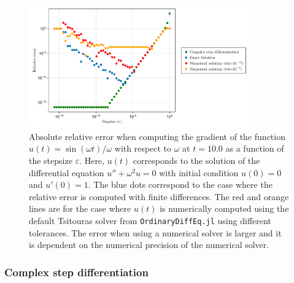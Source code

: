 \begin{figure}[tbh]
    \centering
    \includegraphics[width=0.85\textwidth]{../code/finite_differences/finite_difference_derivative.pdf}
    \caption{Absolute relative error when computing the gradient of the function $u(t) = \sin (\omega t)/\omega$ with respect to $\omega$ at $t=10.0$ as a function of the stepsize $\varepsilon$. Here, $u(t)$ corresponds to the solution of the differential equation $u'' + \omega^2 u = 0$ with initial condition $u(0)=0$ and $u'(0)=1$. The blue dots correspond to the case where the relative error is computed with finite differences. The red and orange lines are for the case where $u(t)$ is numerically computed using the default Tsitouras solver \cite{Tsitouras_2011} from \texttt{OrdinaryDiffEq.jl} using different tolerances. The error when using a numerical solver is larger and it is dependent on the numerical precision of the numerical solver. }
    \label{fig:finite-diff}
\end{figure}

\subsubsection{Complex step differentiation}


